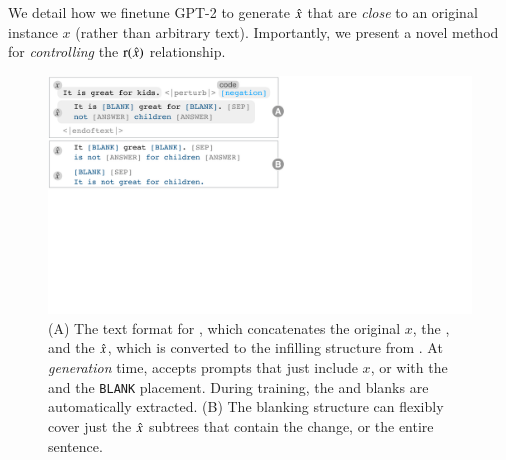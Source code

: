 We detail how we finetune GPT-2 to generate $\hat{x}$ that are \emph{close} to an original instance $x$ (rather than arbitrary text).
Importantly, we present a novel method for \emph{controlling} the $\operatorname*{r}(\hat{x})$ relationship. 

\begin{figure}[t]
\centering
\includegraphics[trim={0 20cm 30cm 0cm}, clip, width=1\columnwidth]{figures/blank.pdf}
\vspace{-15pt}
\caption{
(A) The text format for \sysname, which concatenates the original $x$, the \tagstr, and the $\hat{x}$, which is converted to the infilling structure from .
At \emph{generation} time, \sysname accepts prompts that just include $x$, or with the \tagstrshort and the \texttt{BLANK} placement.
During training, the \tagstrshorts and blanks are automatically extracted.
(B) The blanking structure can flexibly cover just the $\hat{x}$ subtrees that contain the change, or the entire sentence.
}
\vspace{-10pt}
\label{fig:blank}
\end{figure}


